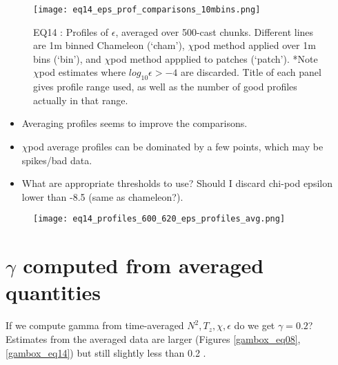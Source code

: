 \documentclass[11pt]{article}
\begin{document}



\begin{figure}[htbp]
\texttt{[image: eq14\_eps\_prof\_comparisons\_10mbins.png]}
\caption{EQ14 : Profiles of $\epsilon$, averaged over 500-cast chunks. Different lines are 1m binned Chameleon (`cham'), $\chi$pod method applied over 1m bins (`bin'), and $\chi$pod method appplied to patches (`patch'). *Note $\chi$pod estimates where $log_{10}\epsilon>-4$ are discarded. Title of each panel gives profile range used, as well as the number of good profiles actually in that range.}
\label{eps_prof_comp_eq14}
\end{figure}


\begin{itemize}
\item Averaging profiles seems to improve the comparisons.
\item $\chi$pod average profiles can be dominated by a few points, which may be spikes/bad data. 
\item What are appropriate thresholds to use? Should I discard chi-pod epsilon lower than -8.5 (same as chameleon?).
\end{itemize}


\begin{figure}[htbp]
\texttt{[image: eq14\_profiles\_600\_620\_eps\_profiles\_avg.png]}
\caption{}
\label{}
\end{figure}




\clearpage
\section{$\gamma$ computed from averaged quantities}

If we compute gamma from time-averaged $N^2,T_z,\chi,\epsilon$ do we get $\gamma=0.2$? Estimates from the averaged data are larger (Figures \ref{gambox_eq08},\ref{gambox_eq14}) but still slightly less than 0.2 .
\end{document}
